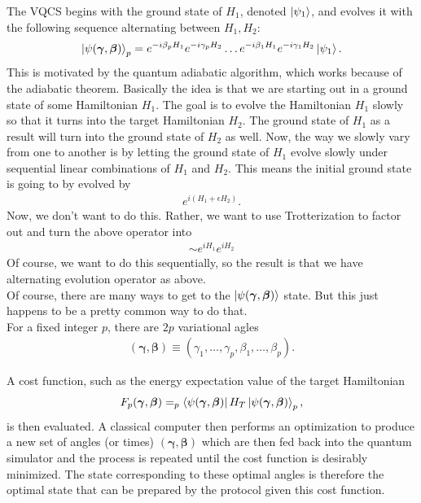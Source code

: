 \documentclass{book}
\theoremstyle{definition}
\begin{document}
The VQCS begins with the ground state of $H_1$, denoted $\ket{\psi_1}$, and evolves it with the following sequence alternating between $H_1, H_2$:
\begin{align}
\ket{\psi(\bm\gamma, \bm\beta)}_p = e^{-i\beta_p H_1}e^{-i\gamma_p H_2}\dots e^{-i \beta_1 H_1}e^{-i \gamma_1 H_2}\ket{\psi_1}.
\end{align}
This is motivated by the quantum adiabatic algorithm, which works because of the adiabatic theorem. Basically the idea is that we are starting out in a ground state of some Hamiltonian $H_1$. The goal is to evolve the Hamiltonian $H_1$ slowly so that it turns into the target Hamiltonian $H_2$. The ground state of $H_1$ as a result will turn into  the ground state of $H_2$ as well. Now, the way we slowly vary from one to another is by letting the ground state of $H_1$ evolve slowly under sequential linear combinations of $H_1$ and $H_2$. This means the initial ground state is going to by evolved by
\begin{align}
e^{i(H_1 + \epsilon H_2)}.
\end{align} 
Now, we don't want to do this. Rather, we want to use Trotterization to factor out and turn the above operator into 
\begin{align}
\sim e^{iH_1}e^{iH_2}
\end{align}
Of course, we want to do this sequentially, so the result is that we have alternating evolution operator as above. \\

Of course, there are many ways to get to the $\ket{\psi(\bm\gamma, \bm\beta)}$ state. But this just happens to be a pretty common way to do that.\\






For a fixed integer $p$, there are $2p$ variational agles 
\begin{align}
(\bm\gamma, \bm\beta) \equiv (\gamma_1,\dots,\gamma_p, \beta_1,\dots, \beta_p).
\end{align}

A cost function, such as the energy expectation value of the target Hamiltonian
\begin{align}
F_p(\bm\gamma, \bm\beta) = _p\bra{ \psi(\bm\gamma,\bm\beta)} H_T \ket{\psi(\bm\gamma,\bm\beta)}_p,
\end{align}
is then evaluated. A classical computer then performs an optimization to produce a new set of angles (or times) $(\bm\gamma, \bm\beta)$ which are then fed back into the quantum simulator and the process is repeated until the cost function is desirably minimized. The state corresponding to these optimal angles is therefore the optimal state that can be prepared by the protocol given this cost function. \\
\end{document}
